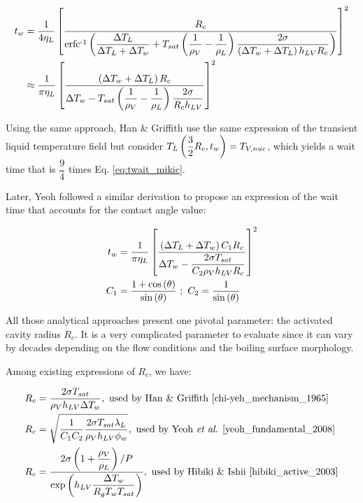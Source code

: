 \begin{align}
t_{w} &= \frac{1}{4\eta_{L}} \crocht{ \frac{R_{c}}{\erfcrec{ \dfrac{\Delta T_{L}}{\Delta T_{L} + \Delta T_{w}} + T_{sat} \parth{\dfrac{1}{\rho_{V}} - \dfrac{1}{\rho_{L}}}\dfrac{2\sigma }{ \parth{\Delta T_{w} + \Delta T_{L}}h_{LV}R_{c} } } } }^{2}\\
%
& \approx \frac{1}{\pi \eta_{L}}\crocht{\frac{ \parth{\Delta T_{w} + \Delta T_{L}}R_{c} }{\Delta T_{w} - T_{sat} \parth{\dfrac{1}{\rho_{V}} - \dfrac{1}{\rho_{L}}}\dfrac{2\sigma  }{R_{c} h_{LV}} } }^{2}
\label{eq:twait_mikic}
\end{align}

Using the same approach, Han \& Griffith \cite{chi-yeh_mechanism_1965} use the same expression of the transient liquid temperature field but consider $T_{L}\left( \dfrac{3}{2}R_{c},t_{w} \right)=T_{V,nuc}$, which yields a wait time that is $\dfrac{9}{4}$ times Eq. \ref{eq:twait_mikic}.

\npar

Later, Yeoh \etal \cite{yeoh_fundamental_2008} followed a similar derivation to propose an expression of the wait time that accounts for the contact angle value:

\begin{align}
t_{w} &= \frac{1}{\pi \eta_{L}}\crocht{ \frac{\parth{\Delta T_{L} + \Delta T_{w}} C_{1} R_{c}}{\Delta T_{w} - \dfrac{2\sigma T_{sat}}{C_{2}\rho_{V}h_{LV}R_{c}}}  }^{2}
\label{eq:twait_yeoh}\\
%
C_{1} &= \frac{1 + \cos{\theta} }{\sin{\theta}}\ ;\ C_{2} = \frac{1}{\sin{\theta}}
\end{align}

\npar

All those analytical approaches present one pivotal parameter: the activated cavity radius $R_{c}$. It is a very complicated parameter to evaluate since it can vary by decades depending on the flow conditions and the boiling surface morphology. 

\npar

Among existing expressions of $R_{c}$, we have:

\begin{align}
R_{c} &= \frac{2\sigma T_{sat}}{\rho_{V}h_{LV}\Delta T_{w}},\ \text{used by Han \& Griffith \cite{chi-yeh_mechanism_1965}}
\label{eq:rc_han}\\
%
R_{c} &= \sqrt{\dfrac{1}{C_{1}C_{2}} \dfrac{2 \sigma T_{sat} \lambda_{L}}{\rho_{V}h_{LV}\phi_{w}}}, \ \text{used by Yeoh \etal \cite{yeoh_fundamental_2008}}
\label{eq:rc_yeoh}\\
%
R_{c} &= \frac{2\sigma\parth{1+ \dfrac{\rho_{V}}{\rho_{L}} } / P}{\exp{h_{LV} \dfrac{\Delta T_{w}}{R_{g}T_{w}T_{sat}} }}, \ \text{used by Hibiki \& Ishii \cite{hibiki_active_2003}}
\label{eq:rc_hibiki}
\end{align}

